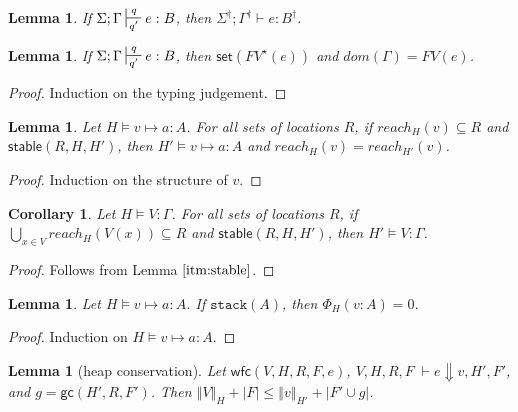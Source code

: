 \documentclass[11pt]{article}
\newcommand{\irl}[1]{\mathtt{#1}}
\newcommand{\stable}[1]{\mathsf{stable}(#1)}
\newcommand{\set}[1]{\mathsf{set}(#1)}
\newcommand{\stack}[1]{\irl{stack}(#1)}
\newcommand{\ssize}[2]{\left\Vert #2 \right\Vert_{#1}}
\newcommand{\gc}[3]{\mathsf{gc}(#1,#2,#3)}
\newcommand{\wfc}[5]{\mathsf{wfc}(#1,#2,#3,#4,#5)}
\newtheorem{lemma}[theorem]{Lemma}
\newtheorem{corollary}{Corollary}[theorem]
\theoremstyle{definition}
\begin{document}
\begin{lemma}
\label{a} If $\Sigma; \Gamma \sststile{q'}{q} e : B$, then $\Sigma^{\dagger}; \Gamma^{\dagger} \vdash e : B^{\dagger}$.
\end{lemma}

\begin{lemma}\label{itm:linear}
\label{a} If $\Sigma; \Gamma \sststile{q'}{q} e : B$, then $\set{FV^{\star}(e)}$ and $dom(\Gamma) = FV(e)$.
\end{lemma}

\begin{proof}
Induction on the typing judgement.
\end{proof}

\begin{lemma}\label{itm:stable}
Let $H \vDash v \mapsto a : A$. For all sets of locations $R$, if $reach_H(v) \subseteq R$ and $\stable{R,H,H'}$, then $H' \vDash v \mapsto a : A$ and $reach_H(v) = reach_{H'}(v)$.
\end{lemma}

\begin{proof}
Induction on the structure of $v$.
\end{proof}

\begin{corollary}
Let $H \vDash V : \Gamma$. For all sets of locations $R$, if $\bigcup_{x \in V} reach_H(V(x)) \subseteq R$ and $\stable{R,H,H'}$, then $H' \vDash V : \Gamma$.
\end{corollary}

\begin{proof}
Follows from Lemma $\ref{itm:stable}$.
\end{proof}

\begin{lemma}\label{itm:stack}
Let $H \vDash v \mapsto a : A$. If $\stack{A}$, then $\Phi_H(v:A) = 0$.
\end{lemma}

\begin{proof}
Induction on $H \vDash v \mapsto a : A$.
\end{proof}

\begin{lemma}[heap conservation]
Let $\wfc{V}{H}{R}{F}{e}$, $V,H,R,F \; \vdash e \Downarrow v, H', F'$, and $g = \gc{H'}{R}{F'}$. 
Then $\ssize{H}{V} + |F| \le \ssize{H'}{v} + |F' \cup g|$.
\end{lemma}
\end{document}
